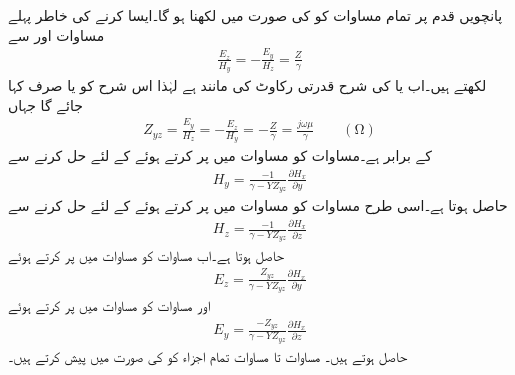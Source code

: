 پانچویں قدم پر تمام مساوات کو  کی صورت میں لکھنا ہو گا۔ایسا کرنے کی خاطر پہلے مساوات  اور  سے
\begin{align}\label{مساوات_مویج_ح}
\frac{E_z}{H_y}=-\frac{E_y}{H_z}=\frac{Z}{\gamma}
\end{align}
لکھتے ہیں۔اب  یا  کی شرح قدرتی رکاوٹ کی مانند ہے لہٰذا اس شرح کو   یا صرف  کہا جائے گا جہاں
\begin{align}\label{مساوات_مویج_خ}
Z_{yz}=\frac{E_y}{H_z}=-\frac{E_z}{H_y}=-\frac{Z}{\gamma}=\frac{j\omega \mu}{\gamma}  \quad \quad (\si{\ohm})
\end{align}
کے برابر ہے۔مساوات  کو مساوات  میں پر کرتے ہوئے  کے لئے حل کرنے سے
\begin{align}\label{مساوات_مویج_د}
H_y=\frac{-1}{\gamma-Y Z_{yz}} \frac{\partial H_x}{\partial y}
\end{align}
حاصل ہوتا ہے۔اسی طرح  مساوات  کو مساوات  میں پر کرتے ہوئے  کے لئے حل کرنے سے
\begin{align}\label{مساوات_مویج_ڈ}
H_z=\frac{-1}{\gamma-Y Z_{yz}} \frac{\partial H_x}{\partial z}
\end{align}
حاصل ہوتا ہے۔اب مساوات  کو مساوات  میں پر کرتے ہوئے
\begin{align}\label{مساوات_مویج_ذ}
E_z=\frac{Z_{yz}}{\gamma-Y Z_{yz}}\frac{\partial H_x}{\partial y}
\end{align}
اور مساوات  کو مساوات  میں پر کرتے ہوئے
\begin{align}\label{مساوات_مویج_ر}
E_y=\frac{-Z_{yz}}{\gamma-Y Z_{yz}}\frac{\partial H_x}{\partial z}
\end{align}
حاصل ہوتے ہیں۔ مساوات  تا مساوات  تمام اجزاء کو  کی صورت میں پیش کرتے ہیں۔ 

